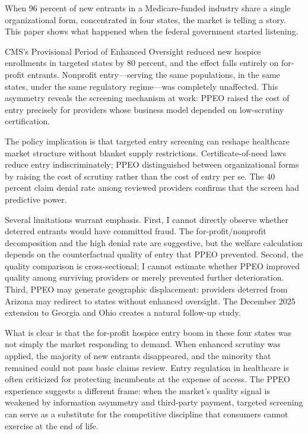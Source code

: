 \documentclass[12pt]{article}
\begin{document}
When 96 percent of new entrants in a Medicare-funded industry share a single organizational form, concentrated in four states, the market is telling a story. This paper shows what happened when the federal government started listening.

CMS's Provisional Period of Enhanced Oversight reduced new hospice enrollments in targeted states by 80 percent, and the effect falls entirely on for-profit entrants. Nonprofit entry---serving the same populations, in the same states, under the same regulatory regime---was completely unaffected. This asymmetry reveals the screening mechanism at work: PPEO raised the cost of entry precisely for providers whose business model depended on low-scrutiny certification.

The policy implication is that targeted entry screening can reshape healthcare market structure without blanket supply restrictions. Certificate-of-need laws reduce entry indiscriminately; PPEO distinguished between organizational forms by raising the cost of scrutiny rather than the cost of entry per se. The 40 percent claim denial rate among reviewed providers confirms that the screen had predictive power.

Several limitations warrant emphasis. First, I cannot directly observe whether deterred entrants would have committed fraud. The for-profit/nonprofit decomposition and the high denial rate are suggestive, but the welfare calculation depends on the counterfactual quality of entry that PPEO prevented. Second, the quality comparison is cross-sectional; I cannot estimate whether PPEO improved quality among surviving providers or merely prevented further deterioration. Third, PPEO may generate geographic displacement: providers deterred from Arizona may redirect to states without enhanced oversight. The December 2025 extension to Georgia and Ohio creates a natural follow-up study.

What is clear is that the for-profit hospice entry boom in these four states was not simply the market responding to demand. When enhanced scrutiny was applied, the majority of new entrants disappeared, and the minority that remained could not pass basic claims review. Entry regulation in healthcare is often criticized for protecting incumbents at the expense of access. The PPEO experience suggests a different frame: when the market's quality signal is weakened by information asymmetry and third-party payment, targeted screening can serve as a substitute for the competitive discipline that consumers cannot exercise at the end of life.
\end{document}
